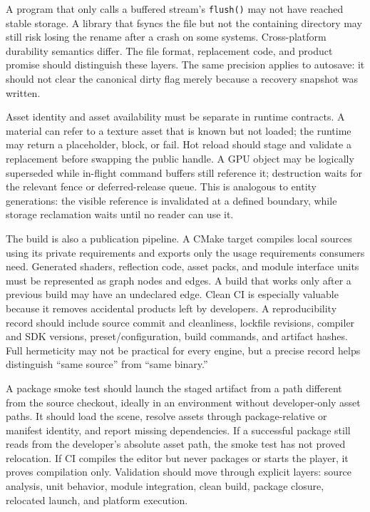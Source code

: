 A program that only calls a buffered stream's \texttt{flush()} may not have reached stable storage. A library that fsyncs the file but not the containing directory may still risk losing the rename after a crash on some systems. Cross-platform durability semantics differ. The file format, replacement code, and product promise should distinguish these layers. The same precision applies to autosave: it should not clear the canonical dirty flag merely because a recovery snapshot was written.

Asset identity and asset availability must be separate in runtime contracts. A material can refer to a texture asset that is known but not loaded; the runtime may return a placeholder, block, or fail. Hot reload should stage and validate a replacement before swapping the public handle. A GPU object may be logically superseded while in-flight command buffers still reference it; destruction waits for the relevant fence or deferred-release queue. This is analogous to entity generations: the visible reference is invalidated at a defined boundary, while storage reclamation waits until no reader can use it.

The build is also a publication pipeline. A CMake target compiles local sources using its private requirements and exports only the usage requirements consumers need. Generated shaders, reflection code, asset packs, and module interface units must be represented as graph nodes and edges. A build that works only after a previous build may have an undeclared edge. Clean CI is especially valuable because it removes accidental products left by developers. A reproducibility record should include source commit and cleanliness, lockfile revisions, compiler and SDK versions, preset/configuration, build commands, and artifact hashes. Full hermeticity may not be practical for every engine, but a precise record helps distinguish ``same source'' from ``same binary.''

A package smoke test should launch the staged artifact from a path different from the source checkout, ideally in an environment without developer-only asset paths. It should load the scene, resolve assets through package-relative or manifest identity, and report missing dependencies. If a successful package still reads from the developer's absolute asset path, the smoke test has not proved relocation. If CI compiles the editor but never packages or starts the player, it proves compilation only. Validation should move through explicit layers: source analysis, unit behavior, module integration, clean build, package closure, relocated launch, and platform execution.

